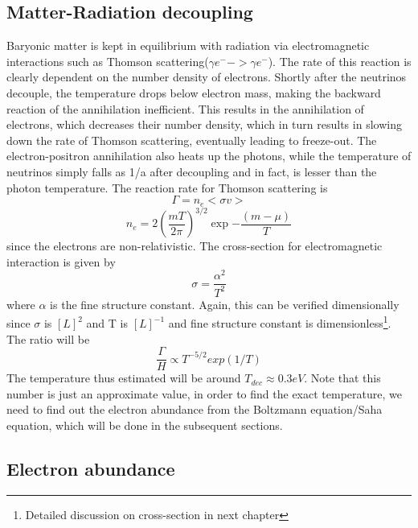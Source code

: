 \documentclass[12pt,a4paper,oneside]{book}
\begin{document}
\subsection{Matter-Radiation decoupling}
Baryonic matter is kept in equilibrium with radiation via electromagnetic interactions such as Thomson scattering($\gamma e^{-} -> \gamma e^{-}$). The rate of this reaction is clearly dependent on the number density of electrons. Shortly after the neutrinos decouple, the temperature drops below electron mass, making the backward reaction of the annihilation  inefficient. This results in the annihilation of electrons, which decreases their number density, which in turn results in slowing down the rate of Thomson scattering, eventually leading to freeze-out. The electron-positron annihilation also heats up the photons, while the temperature of neutrinos simply falls as 1/a after decoupling and in fact, is lesser than the photon temperature.
\newline The reaction rate for Thomson scattering is 
\begin{equation*}
     \Gamma  = n_{e}<\sigma v> 
     \end{equation*}
\begin{equation}
    n_{e}  = 2(\frac{mT}{2\pi})^{3/2}\exp{-\frac{(m-\mu)}{T}}
\end{equation}
since the electrons are non-relativistic. The cross-section for electromagnetic interaction is given by
\begin{equation}
    \sigma = \frac{\alpha^2}{T^2}
\end{equation}
where $\alpha$ is the fine structure constant. Again, this can be verified dimensionally since $\sigma$ is $[L]^{2}$ and T is $[L]^{-1}$ and fine structure constant is dimensionless\footnote{Detailed discussion on cross-section in next chapter}.
\newline The ratio will be 
\begin{equation}
    \frac{\Gamma}{H} \propto T^{-5/2}exp{(1/T)}
\end{equation}
The temperature thus estimated will be around $T_{dec} \approx 0.3eV$.
\newline Note that this number is just an approximate value, in order to find the exact temperature, we need to find out the electron abundance from the Boltzmann equation/Saha equation, which will be done in the subsequent sections.
\subsection{Electron abundance}
\end{document}
